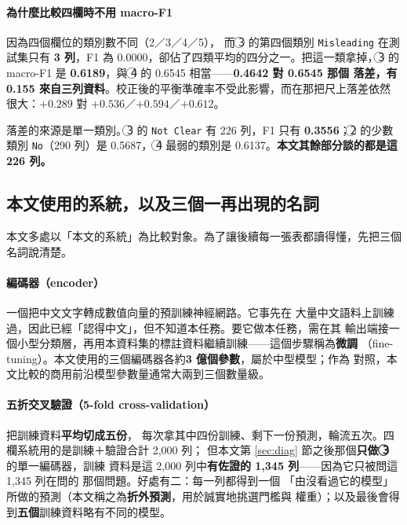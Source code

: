 \documentclass[11pt,a4paper]{ctexart}
\newcommand{\fn}[1]{\texttt{#1}}
\begin{document}
\paragraph{為什麼比較四欄時不用 macro-F1} 因為四個欄位的類別數不同（2／3／4／5），
而 \textcircled{3} 的第四個類別 \fn{Misleading} 在測試集只有 \textbf{3 列}，F1 為
0.0000，卻佔了四類平均的四分之一。把這一類拿掉，\textcircled{3} 的 macro-F1 是
\textbf{0.6189}，與 \textcircled{4} 的 0.6545 相當——\textbf{0.4642 對 0.6545 那個
落差，有 0.155 來自三列資料}。校正後的平衡準確率不受此影響，而在那把尺上落差依然
很大：$+0.289$ 對 $+0.536$／$+0.594$／$+0.612$。

\medskip
落差的來源是單一類別。\textcircled{3} 的 \fn{Not Clear} 有 226 列，F1 只有
\textbf{0.3556}；\textcircled{2} 的少數類別 \fn{No}（290 列）是 0.5687，
\textcircled{4} 最弱的類別是 0.6137。\textbf{本文其餘部分談的都是這 226 列。}

\subsection{本文使用的系統，以及三個一再出現的名詞}
\label{sec:system}

本文多處以「本文的系統」為比較對象。為了讓後續每一張表都讀得懂，先把三個名詞說清楚。

\paragraph{編碼器（encoder）} 一個把中文文字轉成數值向量的預訓練神經網路。它事先在
大量中文語料上訓練過，因此已經「認得中文」，但不知道本任務。要它做本任務，需在其
輸出端接一個小型分類層，再用本資料集的標註資料繼續訓練——這個步驟稱為\textbf{微調}
（fine-tuning）。本文使用的三個編碼器各約\textbf{3 億個參數}，屬於中型模型；作為
對照，本文比較的商用前沿模型參數量通常大兩到三個數量級。

\paragraph{五折交叉驗證（5-fold cross-validation）} 把訓練資料\textbf{平均切成五份}，
每次拿其中四份訓練、剩下一份預測，輪流五次。四欄系統用的是訓練＋驗證合計 2{,}000 列；
但本文第 \ref{sec:diag} 節之後那個\textbf{只做 \textcircled{3}} 的單一編碼器，訓練
資料是這 2{,}000 列中\textbf{有佐證的 1{,}345 列}——因為它只被問這 1{,}345 列在問的
那個問題。好處有二：每一列都得到一個
「由沒看過它的模型」所做的預測（本文稱之為\textbf{折外預測}，用於誠實地挑選門檻與
權重）；以及最後會得到\textbf{五個}訓練資料略有不同的模型。
\end{document}
